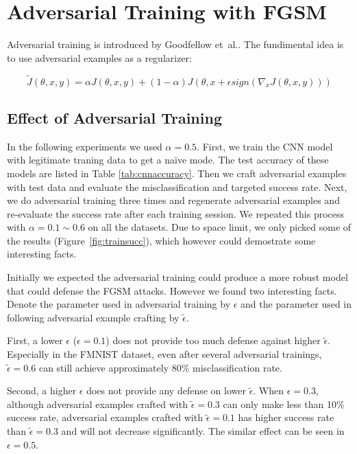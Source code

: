 \documentclass{article}
\begin{document}
\section{Adversarial Training with FGSM}

Adversarial training is introduced by Goodfellow et\ al.\cite{goodfellow2015}. The fundimental idea is to use adversarial examples as a regularizer:

\[ \tilde{J}(\theta, x, y) = \alpha J(\theta, x, y) + (1 - \alpha)J(\theta, x + \epsilon sign(\nabla_xJ(\theta, x, y))) \]


\subsection{Effect of Adversarial Training}

In the following experiments we used $\alpha=0.5$. First, we train the CNN model with legitimate traning data to get a na\"ive mode.
The test accuracy of these models are listed in Table \ref{tab:cnnaccuracy}.
Then we craft adversarial examples with test data and evaluate the misclassification and targeted success rate.
Next, we do adversarial training three times and regenerate adversarial examples and re-evaluate the success rate after each training session.
We repeated this process with $\alpha=0.1\sim 0.6$ on all the datasets.
Due to space limit, we only picked some of the results (Figure~\ref{fig:trainsucc}), which however could demostrate some interesting facts.

Initially we expected the adversarial training could produce a more robust model that could defense the FGSM attacks. However we found two interesting facts.
Denote the parameter used in adversarial training by $\epsilon$ and the parameter used in following adversarial example crafting by $\tilde{\epsilon}$.

First, a lower $\epsilon$ ($\epsilon = 0.1$) does not provide too much defense against higher $\tilde{\epsilon}$. Especially in the FMNIST dataset, 
even after several adversarial trainings, $\tilde{\epsilon}=0.6$ can still achieve approximately 80\% misclassification rate.

Second, a higher $\epsilon$ does not provide any defense on lower $\tilde{\epsilon}$. When $\epsilon=0.3$, although adversarial examples crafted with $\tilde{\epsilon}=0.3$
can only make less than 10\% success rate, adversarial examples crafted with $\tilde{\epsilon}=0.1$ has higher success rate than $\tilde{\epsilon}=0.3$ and will not decrease
significantly. The similar effect can be seen in $\epsilon=0.5$.
\end{document}
